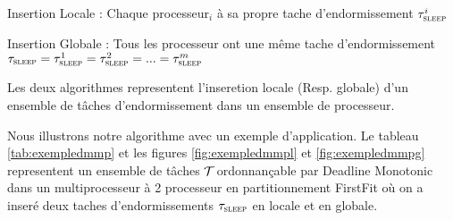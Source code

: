 \begin{description}
\item{Insertion Locale :} Chaque processeur$_i$ à sa propre tache
  d'endormissement $\tau_{\textsc{sleep}}^i$
\item{Insertion Globale :} Tous les processeur ont une même tache
  d'endormissement
  $\tau_{\textsc{sleep}}=\tau_{\textsc{sleep}}^1=\tau_{\textsc{sleep}}^2=...=\tau_{\textsc{sleep}}^m$
\end{description}
Les deux algorithmes representent l'inseretion locale (Resp. globale)
d'un ensemble de tâches d'endormissement dans un ensemble de
processeur.





Nous illustrons notre algorithme avec un exemple d'application. Le
tableau \ref{tab:exempledmmp} et les figures \ref{fig:exempledmmpl} et
\ref{fig:exempledmmpg} representent un ensemble de tâches $\mathcal{T}_{}$
ordonnançable par Deadline Monotonic dans un multiprocesseur à 2
processeur en partitionnement FirstFit où on a inseré deux taches
d'endormissements $\tau_{\textsc{sleep}}$ en locale et en globale.

